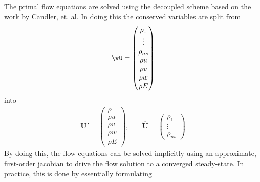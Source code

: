 
The primal flow equations are solved using the decoupled scheme based on the
work by Candler, et. al.  In doing this the conserved variables are split from
\begin{equation}
	\vU =
  \begin{pmatrix}
 		\rho_1    \\
		\vdots    \\
		\rho_{ns} \\
		\rho u    \\
		\rho v    \\
		\rho w    \\
		\rho E    \\
	\end{pmatrix}
  \label{all-vars}
 \end{equation}
 into
\begin{equation}
	\begin{matrix}
		\mathbf{U}'=\begin{pmatrix}
			\rho \\
			\rho u \\
			\rho v \\
			\rho w \\
			\rho E
		\end{pmatrix},\quad &
		\mathbf{\hat{U}}=\begin{pmatrix}
			\rho_1 \\
			\vdots \\
			\rho_{ns}
		\end{pmatrix}
	\end{matrix}
  \label{dc-vars}
\end{equation}
By doing this, the flow equations can be solved implicitly using an approximate,
first-order jacobian to drive the flow solution to a converged steady-state.  In
practice, this is done by essentially formulating
